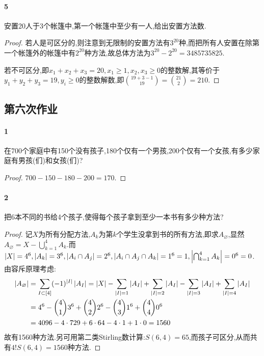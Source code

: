 \documentclass[11pt]{article}
\begin{document}
\paragraph{5}安置20人于3个帐篷中,第一个帐篷中至少有一人,给出安置方法数.
\begin{proof}
    若人是可区分的,则注意到无限制的安置方法有$3^{20}$种,而把所有人安置在除第一个帐篷外的帐篷中有$2^{20}$种方法,故总体方法为$3^{20}-2^{20}=3485735825$.

    若不可区分,即$x_1+x_2+x_3=20, x_1\geq 1, x_2,x_3\geq 0$的整数解,其等价于$y_1+y_2+y_3=19, y_i\geq 0$的整数解数,即$\binom{19+3-1}{19}=\binom{21}{2}=210$.
\end{proof}

\subsection{第六次作业}
\paragraph{1}在700个家庭中有150个没有孩子,180个仅有一个男孩,200个仅有一个女孩,有多少家庭有男孩(们)和女孩(们)?
\begin{proof}
    $700-150-180-200=170$.
\end{proof}

\paragraph{2}把6本不同的书给4个孩子,使得每个孩子拿到至少一本书有多少种方法?
\begin{proof}
    记$X$为所有分配方法,$A_k$为第$k$个学生没拿到书的所有方法,即求$A_\varnothing$,显然$A_\varnothing=X-\bigcup_{k=1}^4 A_k$.而$\left|X\right|=4^6, \left|A_k\right|=3^6, \left|A_i\cap A_j\right|=2^6, \left|A_i\cap A_j\cap A_k\right|=1^6=1, \left|\bigcap_{k=1}^4 A_k\right|=0^6=0$.由容斥原理考虑:
    $$\begin{aligned}
        \left|A_\varnothing\right|&=\sum_{I\subset [4]}(-1)^{\left|I\right|}\left|A_I\right|=\left|X\right|-\sum_{\left|I\right|=1}\left|A_I\right|+\sum_{\left|I\right|=2}\left|A_I\right|-\sum_{\left|I\right|=3}\left|A_I\right|+\sum_{\left|I\right|=4}\left|A_I\right|\\
        &=4^6 - \binom{4}{1}3^6 +\binom{4}{2}2^6-\binom{4}{3}1^6+\binom{4}{4}0^6\\
        &=4096-4\cdot 729+6\cdot 64-4\cdot 1+1\cdot 0=1560
    \end{aligned}$$
    故有1560种方法.另可用第二类Stirling数计算:$S(6,4)=65$,而孩子可区分,从而共有$4!S(6,4)=1560$种方法.
\end{proof}
\end{document}

